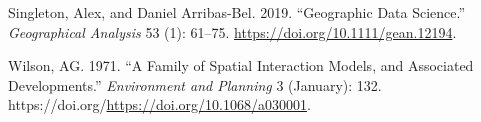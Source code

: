 \documentclass[11pt,letterpaper]{article}
\newlength{\cslhangindent}
\newlength{\cslentryspacingunit} %
\newenvironment{CSLReferences}[2] %
 {%
  \setlength{\parindent}{0pt}
  \ifodd #1
  \let\oldpar\par
  \def\par{\hangindent=\cslhangindent\oldpar}
  \fi
  \setlength{\parskip}{#2\cslentryspacingunit}
 }%
 {}
\begin{document}
\begin{CSLReferences}{1}{0}
\leavevmode{}%
Singleton, Alex, and Daniel Arribas-Bel. 2019. {``Geographic Data Science.''} \emph{Geographical Analysis} 53 (1): 61--75. \url{https://doi.org/10.1111/gean.12194}.

\leavevmode{}%
Wilson, AG. 1971. {``A Family of Spatial Interaction Models, and Associated Developments.''} \emph{Environment and Planning} 3 (January): 132. https://doi.org/\url{https://doi.org/10.1068/a030001}.

\end{CSLReferences}




\setlength{\bibsep}{0.00cm plus 0.05cm} %


\end{document}
